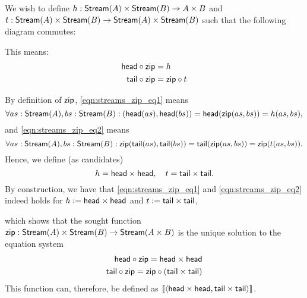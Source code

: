 \begin{solution}\label{sol:zip}

We wish to define $h : \mathsf{Stream}(A)\times\mathsf{Stream}(B)\to A\times B$ and $t: \mathsf{Stream}(A)\times\mathsf{Stream}(B)\to \mathsf{Stream}(A)\times \mathsf{Stream}(B)$ such that the following diagram commutes:
	\begin{center}
	\end{center}
	
	This means:
	\begin{align}
	\mathsf{head} \circ \mathsf{zip} &= h \label{eqn:streams_zip_eq1} \\
	\mathsf{tail} \circ \mathsf{zip} &= \mathsf{zip} \circ t \label{eqn:streams_zip_eq2} 
	\end{align}
	
	By definition of $\mathsf{zip}$, \cref{eqn:streams_zip_eq1} means
	\[
	\forall as : \mathsf{Stream}(A), bs : \mathsf{Stream}(B): (\mathsf{head}(as),\mathsf{head}(bs)) = \mathsf{head}(\mathsf{zip}(as,bs)) = h(as,bs),
	\]
	and \cref{eqn:streams_zip_eq2} means
	\[
	\forall as : \mathsf{Stream}(A), bs : \mathsf{Stream}(B): \mathsf{zip} (\mathsf{tail}(as),\mathsf{tail}(bs)) = \mathsf{tail}(\mathsf{zip}(as,bs)) = \mathsf{zip} (t(as,bs)).
	\]
	Hence, we define (as candidates)
	\[
	h = \mathsf{head}\times\mathsf{head}, \quad t = \mathsf{tail}\times\mathsf{tail}.
	\]
	By construction, we have that \cref{eqn:streams_zip_eq1} and \cref{eqn:streams_zip_eq2} indeed holds for $h := \mathsf{head}\times\mathsf{head}$ and $t := \mathsf{tail}\times\mathsf{tail}$, 

  which shows that the sought function $\mathsf{zip} : \mathsf{Stream}(A) \times \mathsf{Stream}(B) \to \mathsf{Stream}(A\times B)$ is the unique solution to the equation system
  \begin{align*}
    \mathsf{head} \circ \mathsf{zip} = \mathsf{head}\times\mathsf{head}
    \\
    \mathsf{tail} \circ \mathsf{zip} = \mathsf{zip} \circ (\mathsf{tail}\times\mathsf{tail})
  \end{align*}
  This function can, therefore, be defined as $\llbracket  {\langle \ensuremath{\mathsf{head}}\times \ensuremath{\mathsf{head}}, \ensuremath{\mathsf{tail}}\times \ensuremath{\mathsf{tail}}\rangle}  \rrbracket$.
\end{solution}


